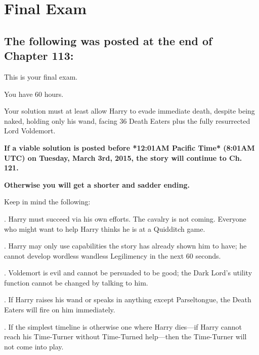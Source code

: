 \chapter{Final Exam}

\section{The following was posted at the end of Chapter 113:}

\noindent
This is your final exam.

\vspace*{.5\baselineskip}\noindent
You have 60 hours.

\vspace*{.5\baselineskip}\noindent
Your solution must at least allow Harry to evade immediate death,
despite being naked, holding only his wand, facing 36 Death Eaters
plus the fully resurrected Lord Voldemort.

\vspace*{.5\baselineskip}\noindent
\textbf{If a viable solution is posted before
*12:01AM Pacific Time* (8:01AM UTC) on Tuesday, March 3rd, 2015,
the story will continue to Ch. 121.}

\vspace*{.5\baselineskip}\noindent
\textbf{Otherwise you will get a shorter and sadder ending.}

\vspace*{.5\baselineskip}\noindent
Keep in mind the following:

\vspace*{.5\baselineskip}. Harry must succeed via his own efforts. The cavalry is not coming.
Everyone who might want to help Harry thinks he is at a Quidditch game.

\vspace*{.5\baselineskip}. Harry may only use capabilities the story has already shown him to
have;
he cannot develop wordless wandless Legilimency in the next 60 seconds.

\vspace*{.5\baselineskip}. Voldemort is evil and cannot be persuaded to be good;
the Dark Lord's utility function cannot be changed by talking to him.

\vspace*{.5\baselineskip}. If Harry raises his wand or speaks in anything except Parseltongue,
the Death Eaters will fire on him immediately.

\vspace*{.5\baselineskip}. If the simplest timeline is otherwise one where Harry dies---if 
Harry cannot reach his Time-Turner without Time-Turned help---then 
the Time-Turner will not come into play.

